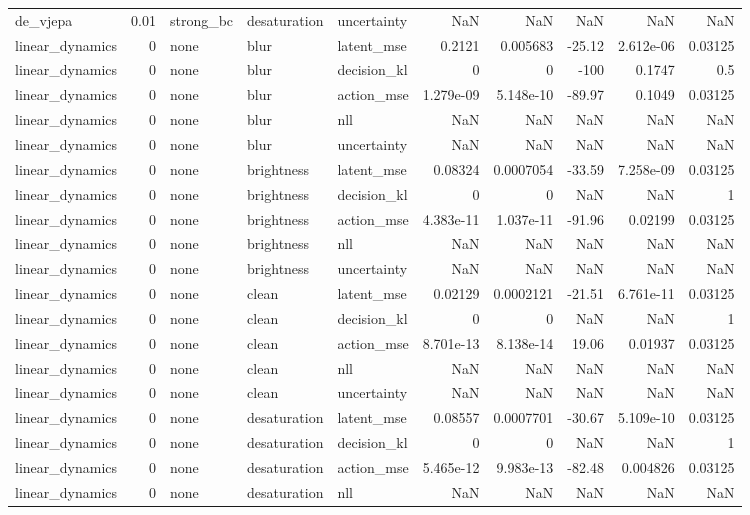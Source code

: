 \begin{tabular}{lrlllrrrrr}
de\_vjepa & 0.01 & strong\_bc & desaturation & uncertainty & NaN & NaN & NaN & NaN & NaN \\
linear\_dynamics & 0 & none & blur & latent\_mse & 0.2121 & 0.005683 & -25.12 & 2.612e-06 & 0.03125 \\
linear\_dynamics & 0 & none & blur & decision\_kl & 0 & 0 & -100 & 0.1747 & 0.5 \\
linear\_dynamics & 0 & none & blur & action\_mse & 1.279e-09 & 5.148e-10 & -89.97 & 0.1049 & 0.03125 \\
linear\_dynamics & 0 & none & blur & nll & NaN & NaN & NaN & NaN & NaN \\
linear\_dynamics & 0 & none & blur & uncertainty & NaN & NaN & NaN & NaN & NaN \\
linear\_dynamics & 0 & none & brightness & latent\_mse & 0.08324 & 0.0007054 & -33.59 & 7.258e-09 & 0.03125 \\
linear\_dynamics & 0 & none & brightness & decision\_kl & 0 & 0 & NaN & NaN & 1 \\
linear\_dynamics & 0 & none & brightness & action\_mse & 4.383e-11 & 1.037e-11 & -91.96 & 0.02199 & 0.03125 \\
linear\_dynamics & 0 & none & brightness & nll & NaN & NaN & NaN & NaN & NaN \\
linear\_dynamics & 0 & none & brightness & uncertainty & NaN & NaN & NaN & NaN & NaN \\
linear\_dynamics & 0 & none & clean & latent\_mse & 0.02129 & 0.0002121 & -21.51 & 6.761e-11 & 0.03125 \\
linear\_dynamics & 0 & none & clean & decision\_kl & 0 & 0 & NaN & NaN & 1 \\
linear\_dynamics & 0 & none & clean & action\_mse & 8.701e-13 & 8.138e-14 & 19.06 & 0.01937 & 0.03125 \\
linear\_dynamics & 0 & none & clean & nll & NaN & NaN & NaN & NaN & NaN \\
linear\_dynamics & 0 & none & clean & uncertainty & NaN & NaN & NaN & NaN & NaN \\
linear\_dynamics & 0 & none & desaturation & latent\_mse & 0.08557 & 0.0007701 & -30.67 & 5.109e-10 & 0.03125 \\
linear\_dynamics & 0 & none & desaturation & decision\_kl & 0 & 0 & NaN & NaN & 1 \\
linear\_dynamics & 0 & none & desaturation & action\_mse & 5.465e-12 & 9.983e-13 & -82.48 & 0.004826 & 0.03125 \\
linear\_dynamics & 0 & none & desaturation & nll & NaN & NaN & NaN & NaN & NaN \\

\end{tabular}
